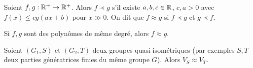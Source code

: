     \begin{defi}
      Soient $f, g: \mathbb{R}^+ \to \mathbb{R}^+$. Alors $f \prec g$ s'il existe $a, b, c \in \mathbb{R}$, $c, a > 0$ avec $f(x) \leq
      cg(ax+b)$ pour $x \gg 0$.
      On dit que $f \approx g$ si $f \prec g$ et $g \prec f$.
    \end{defi}

    \begin{exercice}
      Si $f, g$ sont des polynômes de même degré, alors $f \approx g$.
    \end{exercice}

    \begin{prop}
      Soient $(G_1, S)$ et $(G_2, T)$ deux groupes quasi-isométriques (par exemples $S, T$ deux parties
      génératrices finies du même groupe $G$). Alors $V_S \approx V_T$.
    \end{prop}

